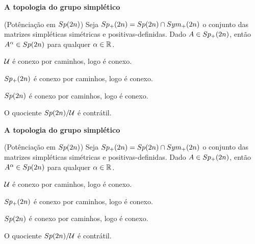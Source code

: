 \documentclass{beamer}
\newcommand{\titulo}[1]{\centering \textbf{#1}}
\begin{document}
\begin{frame}
	\titulo{A topologia do grupo simplético}
	\begin{proposicao}
		(Potênciação em $Sp(2n)$) Seja $Sp_{+}(2n) = Sp(2n) \cap Sym_{+}(2n)$ o conjunto das matrizes simpléticas simétricas e positivas-definidas. Dado $A \in Sp_{+}(2n)$, então $A^{\alpha} \in Sp(2n)$ para qualquer $\alpha \in \mathbb{R}^{}$.
	\end{proposicao}
	
	\begin{lema}
		$\mathcal{U}$ é conexo por caminhos, logo é conexo.
	\end{lema}
	
	\begin{lema}
		$Sp_{+}(2n)$ é conexo por caminhos, logo é conexo.
	\end{lema}
	
	\begin{teorema}
		$Sp(2n)$ é conexo por caminhos, logo é conexo.
	\end{teorema}
	
	\begin{teorema}
		O quociente $Sp(2n)/\mathcal{U}$ é contrátil.
	\end{teorema}
	
\end{frame}

\begin{frame}
	\titulo{A topologia do grupo simplético}
	\begin{proposicao}
		(Potênciação em $Sp(2n)$) Seja $Sp_{+}(2n) = Sp(2n) \cap Sym_{+}(2n)$ o conjunto das matrizes simpléticas simétricas e positivas-definidas. Dado $A \in Sp_{+}(2n)$, então $A^{\alpha} \in Sp(2n)$ para qualquer $\alpha \in \mathbb{R}^{}$.
	\end{proposicao}
	
	\begin{lema}
		$\mathcal{U}$ é conexo por caminhos, logo é conexo.
	\end{lema}
	
	\begin{lema}
		$Sp_{+}(2n)$ é conexo por caminhos, logo é conexo.
	\end{lema}
	
	\begin{teorema}
		$Sp(2n)$ é conexo por caminhos, logo é conexo.
	\end{teorema}
	
	\begin{teorema}
		O quociente $Sp(2n)/\mathcal{U}$ é contrátil.
	\end{teorema}
	
\end{frame}
\end{document}

